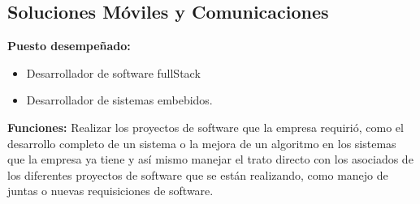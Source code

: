 \documentclass[protocolo.tex]{subfiles}
\begin{document}
\vfill %
\subsection{Soluciones Móviles y Comunicaciones}


\textbf{Puesto desempeñado:} 
\begin{itemize}
\item Desarrollador de software fullStack
\item Desarrollador de sistemas embebidos.
\end{itemize}



\textbf{Funciones:}
Realizar los proyectos de software que la empresa requirió, como el desarrollo completo de un
sistema o la mejora de un algoritmo en los sistemas que la empresa ya tiene y así mismo
manejar el trato directo con los asociados de los diferentes proyectos de software que se
están realizando, como manejo de juntas o nuevas requisiciones de software.\vspace{5mm} 
\end{document}

